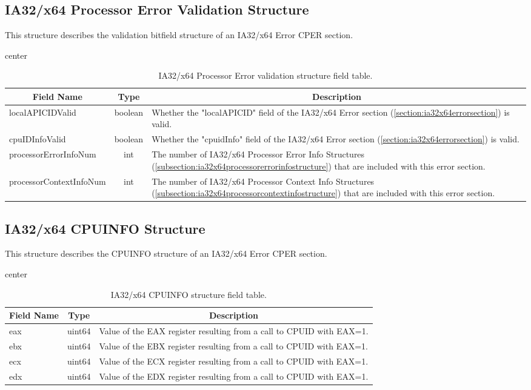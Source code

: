 \documentclass{report}
\newcommand*{\thead}[1]{\multicolumn{1}{|c|}{\bfseries #1}}
\newcommand*{\jsontable}[1]{
    \begin{table}[!ht]
    \label{#1}
    \centering
    \begin{adjustbox}{center}
    \begin{tabular}{|l|c|p{8cm}|}
    \hline
    \thead{Field Name} & \thead{Type} & \thead{Description} \\
    \hline
}
\newcommand*{\jsontableend}[1]{
    \hline
    \end{tabular}
    \end{adjustbox}
    \caption{#1}
    \label{table:#1}
    \end{table}
    \FloatBarrier
}
\begin{document}
\subsection{IA32/x64 Processor Error Validation Structure}
\label{subsection:ia32x64processorflagsstructure}
This structure describes the validation bitfield structure of an IA32/x64 Error CPER section.
\jsontable{table:ia32x64processorflagsstructure}
localAPICIDValid & boolean & Whether the "localAPICID" field of the IA32/x64 Error section (\ref{section:ia32x64errorsection}) is valid.\\
\hline
cpuIDInfoValid & boolean & Whether the "cpuidInfo" field of the IA32/x64 Error section (\ref{section:ia32x64errorsection}) is valid.\\ 
\hline
processorErrorInfoNum & int & The number of IA32/x64 Processor Error Info Structures (\ref{subsection:ia32x64processorerrorinfostructure}) that are included with this error section.\\
\hline
processorContextInfoNum & int & The number of IA32/x64 Processor Context Info Structures (\ref{subsection:ia32x64processorcontextinfostructure}) that are included with this error section.\\
\jsontableend{IA32/x64 Processor Error validation structure field table.}

\subsection{IA32/x64 CPUINFO Structure}
\label{subsection:ia32x64cpuinfostructure}
This structure describes the CPUINFO structure of an IA32/x64 Error CPER section.
\jsontable{table:ia32x64cpuinfostructure}
eax & uint64 & Value of the EAX register resulting from a call to CPUID with EAX=1.\\
\hline
ebx & uint64 & Value of the EBX register resulting from a call to CPUID with EAX=1.\\
\hline
ecx & uint64 & Value of the ECX register resulting from a call to CPUID with EAX=1.\\
\hline
edx & uint64 & Value of the EDX register resulting from a call to CPUID with EAX=1.\\
\jsontableend{IA32/x64 CPUINFO structure field table.}

\end{document}
